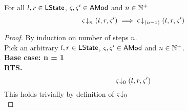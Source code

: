 %
%
%
%
%
\begin{lemma}[]\label{lem:amodClosureImplication}
For all $l, r \in \textsf{LState}$, $\varsigma_{}, \varsigma_{}' \in \textsf{AMod}$ and $n \in \mathbb{N}^{+}$
%
\[
	\varsigma_{} \!\downarrow_{n} \left(l, r, \varsigma_{}'\right) \implies \varsigma_{} \!\downarrow_{(n-1)} \left(l, r, \varsigma_{}'\right)
\]
%
\begin{proof} By induction on number of steps $n$.\\
Pick an arbitrary $l, r \in \textsf{LState}$, $\varsigma_{}, \varsigma_{}' \in \textsf{AMod}$ and $n \in \mathbb{N}^{+}$.\\
\textbf{Base case: n = 1}\\
\textbf{RTS.} 
%
\begin{equation}
	\varsigma_{} \!\downarrow_{0} \left(l, r, \varsigma_{}'\right) \nonumber
\end{equation}
%
This holds trivially by definition of $\varsigma_{}\!\downarrow_{0}$\\


\end{proof}
\end{lemma}
